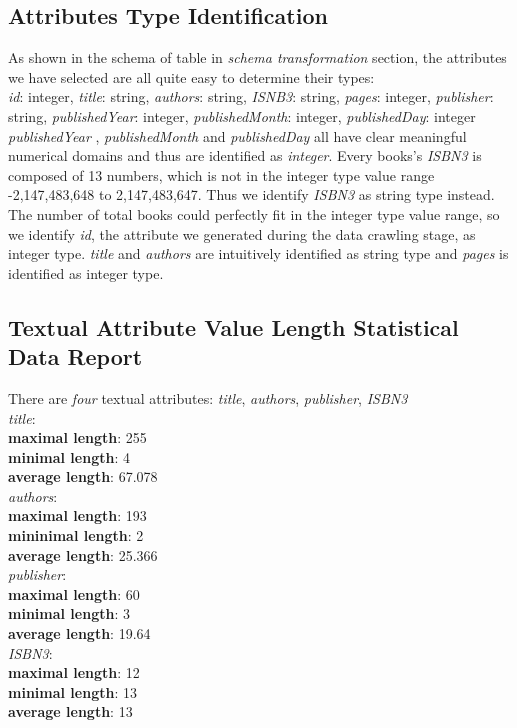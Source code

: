 \documentclass[10pt, oneside]{article}
\begin{document}
\subsection*{Attributes Type Identification}
As shown in the schema of table in \textit{schema transformation} section, the attributes we have selected are all quite easy to determine their types:
\vspace{1ex}
\\
\textit{id}: integer, \textit{title}: string, \textit{authors}: string, \textit{ISNB3}: string,  \textit{pages}: integer, \textit{publisher}: string, \textit{publishedYear}: integer, \textit{publishedMonth}: integer, \textit{publishedDay}: integer
\vspace{1ex}
\\
\textit{publishedYear} , \textit{publishedMonth} and \textit{publishedDay} all have clear meaningful numerical domains and thus are identified as \textit{integer}. Every books's \textit{ISBN3} is composed of 13 numbers, which is not in the integer type value range  -2,147,483,648 to 2,147,483,647. Thus we identify \textit{ISBN3} as string type instead.
The number of total books could perfectly fit in the integer type value range, so we identify \textit{id}, the attribute we generated during the data crawling stage, as integer type.
\textit{title} and \textit{authors} are intuitively identified as string type and \textit{pages} is identified as integer type.

\subsection*{Textual Attribute Value Length Statistical Data Report}
There are \textit{four} textual attributes: \textit{title}, \textit{authors}, \textit{publisher}, \textit{ISBN3}
\vspace{0.5ex}
\\
\textit{title}: \\
\textbf{maximal length}: 255\\
\textbf{minimal length}: 4\\
\textbf{average length}: 67.078
\vspace{0.5ex}
\\
\textit{authors}:\\ 
\textbf{maximal length}: 193\\
\textbf{mininimal length}: 2\\
\textbf{average length}: 25.366
\vspace{0.5ex}
\\
\textit{publisher}:\\ 
\textbf{maximal length}: 60\\
\textbf{minimal length}: 3\\
\textbf{average length}: 19.64
\vspace{0.5ex}
\\
\textit{ISBN3}:\\ 
\textbf{maximal length}: 12\\
\textbf{minimal length}: 13\\
\textbf{average length}: 13
\end{document}
